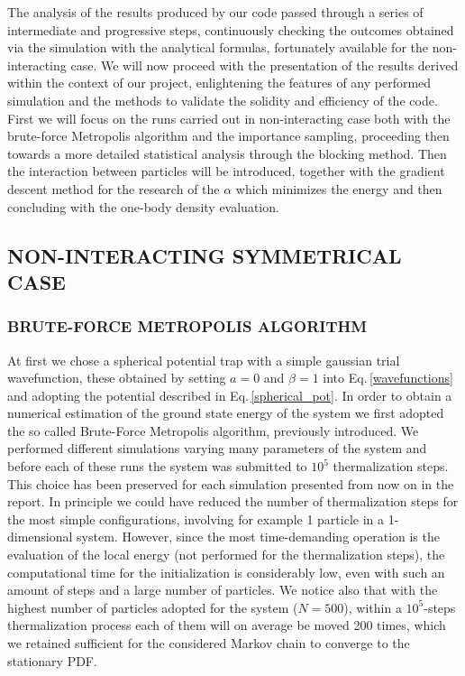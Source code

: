 The analysis of the results produced by our code passed through a series of intermediate and progressive steps, continuously checking the outcomes obtained via the simulation with the analytical formulas, fortunately available for the non-interacting case. We will now proceed with the presentation of the results derived within the context of our project, enlightening the features of any performed simulation and the methods to validate the solidity and efficiency of the code. First we will focus on the runs carried out in non-interacting case both with the brute-force Metropolis algorithm and the importance sampling, proceeding then towards a more detailed statistical analysis through the blocking method. Then the interaction between particles will be introduced, together with the gradient descent method for the research of the $\alpha$ which minimizes the energy and then concluding with the one-body density evaluation.


\subsection{NON-INTERACTING SYMMETRICAL CASE}
\subsubsection{BRUTE-FORCE METROPOLIS ALGORITHM}
At first we chose a spherical potential trap with a simple gaussian trial wavefunction, these obtained by setting $a=0$ and $\beta=1$ into Eq.\,\ref{wavefunctions} and adopting the potential described in Eq.\,\ref{spherical_pot}. In order to obtain a numerical estimation of the ground state energy of the system we first adopted the so called Brute-Force Metropolis algorithm, previously introduced. We performed different simulations varying many parameters of the system and before each of these runs the system was submitted to $10^5$ thermalization steps. This choice has been preserved for each simulation presented from now on in the report. In principle we could have reduced the number of thermalization steps for the most simple configurations, involving for example 1 particle in a 1-dimensional system. However, since the most time-demanding operation is the evaluation of the local energy (not performed for the thermalization steps), the computational time for the initialization is considerably low, even with such an amount of steps and a large number of particles. We notice also that with the highest number of particles adopted for the system ($N=500$), within a $10^5$-steps thermalization process each of them will on average be moved 200 times, which we retained sufficient for the considered Markov chain to converge to the stationary PDF. 


